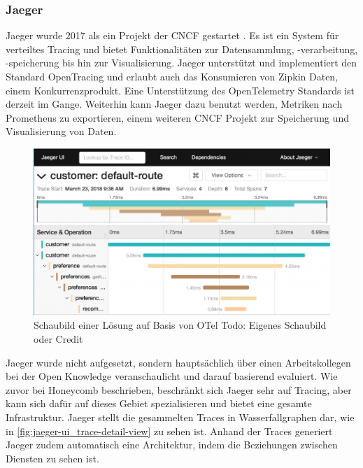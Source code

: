 \subsubsection{Jaeger}

Jaeger wurde 2017 als ein Projekt der CNCF gestartet \cite{Jaeger}. Es ist ein System für verteiltes Tracing und bietet Funktionalitäten zur Datensammlung, -verarbeitung, -speicherung bis hin zur Visualisierung. Jaeger unterstützt und implementiert den Standard OpenTracing und erlaubt auch das Konsumieren von Zipkin Daten, einem Konkurrenzprodukt. Eine Unterstützung des OpenTelemetry Standards ist derzeit im Gange. Weiterhin kann Jaeger dazu benutzt werden, Metriken nach Prometheus \cite{Prometheus} zu exportieren, einem weiteren CNCF Projekt zur Speicherung und Visualisierung von Daten.

\begin{figure}
\centering
\vspace{-\baselineskip}
\includegraphics[width=\linewidth]{img/03_methoden/redhat_jaeger-ui_trace-detail-view.png}
\caption{Schaubild einer Lösung auf Basis von OTel {\color{red}Todo: Eigenes Schaubild oder Credit}}
\label{fig:jaeger-ui_trace-detail-view}
\end{figure}

Jaeger wurde nicht aufgesetzt, sondern hauptsächlich über einen Arbeitskollegen bei der Open Knowledge veranschaulicht und darauf basierend evaluiert. Wie zuvor bei Honeycomb beschrieben, beschränkt sich Jaeger sehr auf Tracing, aber kann sich dafür auf dieses Gebiet spezialisieren und bietet eine gesamte Infrastruktur. Jaeger stellt die gesammelten Traces in Wasserfallgraphen dar, wie in \autoref{fig:jaeger-ui_trace-detail-view} zu sehen ist. Anhand der Traces generiert Jaeger zudem automatisch eine Architektur, indem die Beziehungen zwischen Diensten zu sehen ist.

